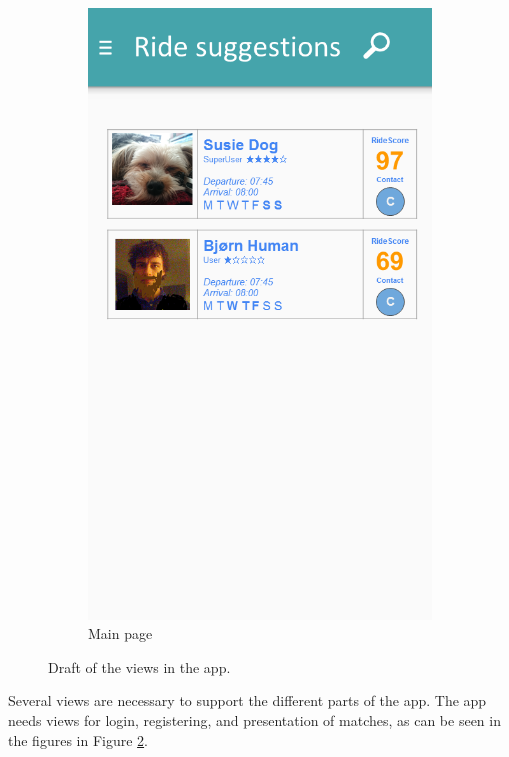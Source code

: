 \begin{figure}[h!]
\begin{subfigure}[b]{0.3\textwidth}
		\includegraphics[width=\textwidth]{figures/GUI-main.png}
		\caption{Main page}
		\label{fig:GUI-main}
	\end{subfigure}
	 \caption{Draft of the views in the app.}\label{fig:GUI-firstrun}
\end{figure}

Several views are necessary to support the different parts of the app. 
The app needs views for login, registering, and presentation of matches, as can be seen in the figures in Figure \ref{fig:GUI-firstrun}.

